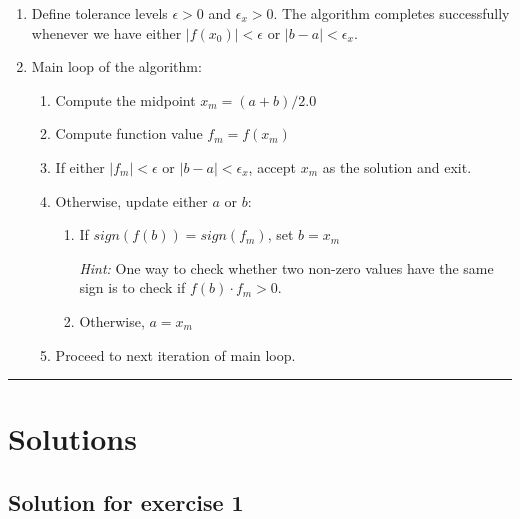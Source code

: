 \documentclass[10pt]{scrartcl}
\providecommand{\tightlist}{%
      \setlength{\itemsep}{0pt}\setlength{\parskip}{0pt}}
\begin{document}
\begin{enumerate}
\def\labelenumi{\arabic{enumi}.}
\tightlist
\item
  Define tolerance levels \(\epsilon > 0\) and \(\epsilon_x > 0\). The
  algorithm completes successfully whenever we have either
  \(|f(x_0)| < \epsilon\) or \(|b-a|<\epsilon_x\).
\item
  Main loop of the algorithm:

  \begin{enumerate}
  \def\labelenumii{\arabic{enumii}.}
  \tightlist
  \item
    Compute the midpoint \(x_m = (a+b)/2.0\)
  \item
    Compute function value \(f_m = f(x_m)\)
  \item
    If either \(|f_m| < \epsilon\) or \(|b-a|< \epsilon_x\), accept
    \(x_m\) as the solution and exit.
  \item
    Otherwise, update either \(a\) or \(b\):

    \begin{enumerate}
    \def\labelenumiii{\arabic{enumiii}.}
    \item
      If \(sign(f(b)) = sign(f_m)\), set \(b = x_m\)

      \emph{Hint:} One way to check whether two non-zero values have the
      same sign is to check if \(f(b) \cdot f_m > 0\).
    \item
      Otherwise, \(a = x_m\)
    \end{enumerate}
  \item
    Proceed to next iteration of main loop.
  \end{enumerate}
\end{enumerate}

    \begin{center}\rule{0.5\linewidth}{0.5pt}\end{center}

\hypertarget{solutions}{%
\section{Solutions}\label{solutions}}

\hypertarget{solution-for-exercise-1}{%
\subsection{Solution for exercise 1}\label{solution-for-exercise-1}}
\end{document}
